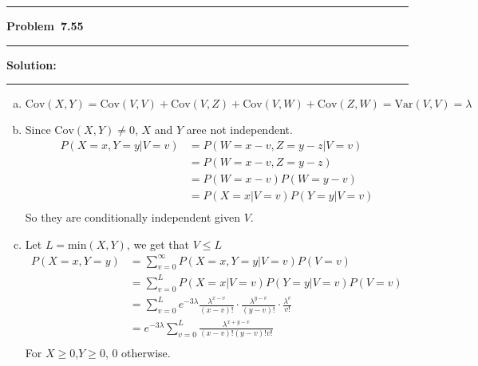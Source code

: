 \documentclass[10.5pt]{article}
\newcommand\question[1]{\vspace{.2in}\hrule\vspace{0.04in}\textbf{Problem\ #1}\vspace{.4em}\hrule\vspace{.10in}}
\newcommand\Solution{\vspace{.3in}\textbf{Solution:}\vspace{.5em}\hrule\vspace{.08in}\par}
\begin{document}
\pagebreak
\question{7.55}
\Solution{}
\begin{enumerate}[(a)]
	\item $$\text{Cov}(X, Y)=\text{Cov}(V, V)+\text{Cov}(V,Z)+\text{Cov}(V, W)+\text{Cov}(Z, W)=\text{Var}(V, V) = \lambda$$\vspace{1cm}
	\item Since $\text{Cov}(X, Y)\neq0$, $X$ and $Y$ aree not independent.\begin{align*}
		P(X=x,Y=y|V=v)
		&=P(W=x-v, Z=y-z|V=v)\\[6pt]
		&=P(W=x-v, Z=y-z)\\[6pt]
		&=P(W = x-v)P(W = y-v)\\[6pt]
		&=P(X=x|V=v)P(Y=y|V=v)\\[6pt]
	\end{align*} So they are conditionally independent given $V$.\vspace{1cm}
	\item Let $L = \text{min}(X, Y)$, we get that $V\leqslant L$ \begin{align*}
		P(X=x, Y=y)&=\sum_{v=0}^{\infty}P(X=x, Y=y|V=v)P(V=v)\\[6pt]
		&=\sum_{v=0}^{L}P(X=x|V=v)P(Y=y|V=v)P(V=v)\\[6pt]
		&=\sum_{v=0}^{L}e^{-3\lambda}\frac{\lambda^{x-v}}{(x-v)!}\cdot \frac{\lambda^{y-v}}{(y-v)!}\cdot\frac{\lambda^v}{v!}\\[6pt]
		&=e^{-3\lambda}\sum_{v=0}^{L}\frac{\lambda^{x+y-v}}{(x-v)!(y-v)!v!}\\[6pt]
	\end{align*}For $X\geqslant0$,$Y\geqslant0$, $0$ otherwise. 
\end{enumerate}
\pagebreak
\end{document}
